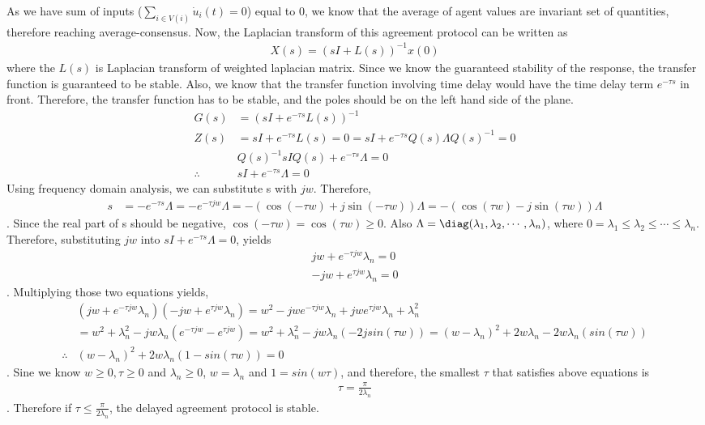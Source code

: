 \documentclass{article}
\begin{document}
\begin{problem}
    As we have sum of inputs ($\sum_{i \in V(i)} \dot u_i(t) = 0$) equal to 0, we know that the average of agent values are invariant set of quantities, therefore reaching average-consensus. Now, the Laplacian transform of this agreement protocol can be written as
    \begin{align*}
        X(s) = (sI + L(s))^{-1} x(0)
    \end{align*}
    where the $L(s)$ is Laplacian transform of weighted laplacian matrix. Since we know the guaranteed stability of the response, the transfer function is guaranteed to be stable. Also, we know that the transfer function involving time delay would have the time delay term $e^{-\tau s}$ in front. Therefore, the transfer function has to be stable, and the poles should be on the left hand side of the plane.
    \begin{align*}
        G(s) &= (sI + e^{-\tau s} L(s))^{-1}\\
        Z(s) &= sI + e^{-\tau s} L(s) = 0 = sI + e^{-\tau s} Q(s) \Lambda Q(s)^{-1} = 0\\
        &Q(s)^{-1} sI Q(s)+ e^{-\tau s} \Lambda = 0\\
        \therefore &sI + e^{-\tau s} \Lambda  = 0
    \end{align*}
    Using frequency domain analysis, we can substitute s with $jw$. Therefore, 
    \begin{align*}
        s & = - e^{-\tau s} \Lambda = -  e^{-\tau jw} \Lambda = - (\cos{(-\tau w)}+ j\sin{(-\tau w)})\Lambda = -(\cos{(\tau w)}- j \sin{(\tau w)})\Lambda 
    \end{align*}.
    Since the real part of s should be negative, $\cos{(-\tau w)}=\cos{(\tau w)} \geq 0$. Also $\Lambda = \diag (\lambda_1, \lambda_2, \cdots, \lambda_n)$, where $0= \lambda_1 \leq \lambda_2 \leq \cdots \leq \lambda_n$. Therefore, substituting $jw$ into $sI + e^{-\tau s} \Lambda  = 0$, yields 
    \begin{align*}
        jw + e^{-\tau jw} \lambda_n= 0\\
        -jw + e^{\tau jw} \lambda_n= 0
    \end{align*}.
    Multiplying those two equations yields,
    \begin{align*}
        &(jw + e^{-\tau jw} \lambda_n)(-jw + e^{\tau jw} \lambda_n) = w^2 - jwe^{-\tau jw} \lambda_n + jw e^{\tau jw} \lambda_n + \lambda_n^2\\
        &= w^2 + \lambda_n^2 - jw\lambda_n(e^{-\tau jw}  - e^{\tau jw} ) = w^2 + \lambda_n^2 - jw\lambda_n(-2jsin(\tau w)) = (w-\lambda_n)^2 + 2w \lambda_n - 2w\lambda_n(sin(\tau w))\\
        \therefore &(w - \lambda_n)^2 + 2w\lambda_n(1-sin(\tau w)) = 0
    \end{align*}.
    Sine we know $w \geq 0, \tau \geq 0$ and $\lambda_n \geq 0$, $w = \lambda_n$ and $1 = sin(w\tau)$, and therefore, the smallest $\tau$ that satisfies above equations is
    \begin{align*}
        \tau = \frac{\pi}{2\lambda_n} 
    \end{align*}.
    Therefore if $\tau \leq \frac{\pi}{2\lambda_n}$, the delayed agreement protocol is stable.


\end{problem}
\end{document}
